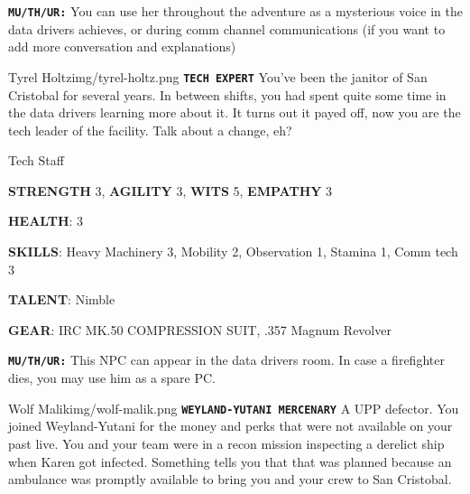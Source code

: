 \begin{rpg-commentbox}{}
    \texttt{\textbf{MU/TH/UR:}} You can use her throughout the adventure as a mysterious voice in the data drivers achieves, or during comm channel communications (if you want to add more conversation and explanations)
\end{rpg-commentbox}


\newsect

\medskip \medskip \medskip \medskip \medskip \medskip \medskip \medskip \medskip \medskip \medskip \medskip 
\medskip \medskip \medskip \medskip \medskip \medskip \medskip \medskip \medskip \medskip \medskip \medskip 




\begin{rpg-pcbox}{Tyrel Holtz}{img/tyrel-holtz.png}
    \texttt{\textbf{TECH EXPERT}} You've been the janitor of San Cristobal for several years. In between shifts, you had spent quite some time in the data drivers learning more about it. It turns out it payed off, now you are the tech leader of the facility. Talk about a change, eh?
\end{rpg-pcbox}

\begin{rpg-commentbox}{}
    Tech Staff

    \textbf{STRENGTH} 3, \textbf{AGILITY} 3, \textbf{WITS} 5, \textbf{EMPATHY} 3

    \textbf{HEALTH}: 3

    \textbf{SKILLS}: Heavy Machinery 3, Mobility 2, Observation 1, Stamina 1, Comm tech 3
    
    \textbf{TALENT}: Nimble
    
    \textbf{GEAR}: IRC MK.50 COMPRESSION SUIT, .357 Magnum Revolver

\end{rpg-commentbox}

\begin{rpg-commentbox}{}
    \texttt{\textbf{MU/TH/UR:}} This NPC can appear in the data drivers room. In case a firefighter dies, you may use him as a spare PC.
\end{rpg-commentbox}


\newsect

\clearpage


\begin{rpg-pcbox}{Wolf Malik}{img/wolf-malik.png}
    \texttt{\textbf{WEYLAND-YUTANI MERCENARY}} A UPP defector. You joined Weyland-Yutani for the money and perks that were not available on your past live. You and your team were in a recon mission inspecting a derelict ship when Karen got infected. Something tells you that that was planned because an ambulance was promptly available to bring you and your crew to San Cristobal.
\end{rpg-pcbox}

